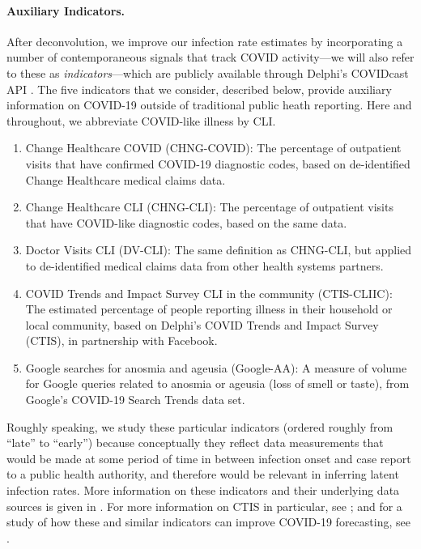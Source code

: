 \documentclass[sts]{imsart}
\theoremstyle{plain}
\theoremstyle{definition}
\theoremstyle{remark}
\begin{document}
\smallskip
\paragraph*{Auxiliary Indicators.}

After deconvolution, we improve our infection rate estimates by incorporating a
number of contemporaneous signals that track COVID activity---we will also 
refer to these as \emph{indicators}---which are publicly available through
Delphi's COVIDcast API \citep{Reinhart:2021}. The five indicators that we
consider, described below, provide auxiliary information on COVID-19 outside of 
traditional public heath reporting. Here and throughout, we abbreviate
COVID-like illness by CLI. 

\begin{enumerate}
\item Change Healthcare COVID (CHNG-COVID): The percentage of outpatient
  visits that have confirmed COVID-19 diagnostic codes, based on de-identified 
  Change Healthcare medical claims data. 
\item Change Healthcare CLI (CHNG-CLI): The percentage of outpatient visits that
  have COVID-like diagnostic codes, based on the same data.
\item Doctor Visits CLI (DV-CLI): The same definition as CHNG-CLI, but applied
  to de-identified medical claims data from other health systems partners. 
\item COVID Trends and Impact Survey CLI in the community
  (CTIS-CLIIC): The estimated percentage of people reporting  
  illness in their household or local community, based on Delphi's COVID
  Trends and Impact Survey (CTIS), in partnership with Facebook. 
\item Google searches for anosmia and ageusia (Google-AA): A measure of volume
  for Google queries related to anosmia or ageusia (loss of smell or taste),
  from Google's COVID-19 Search Trends data set. 
\end{enumerate}

Roughly speaking, we study these particular indicators (ordered roughly from
``late'' to ``early'') because conceptually they reflect data measurements that
would be made at some period of time in between infection onset and case report
to a public health authority, and therefore would be relevant in inferring
latent infection rates. More information on these indicators and their
underlying data sources is given in \citet{Reinhart:2021}. For more information
on CTIS in particular, see \citet{Salomon:2021}; and for a study of how these
and similar indicators can improve COVID-19 forecasting, see
\citet{McDonald:2021}.
\end{document}
